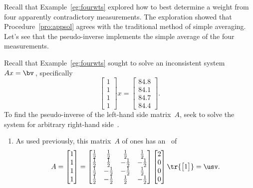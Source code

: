 \begin{example} \label{ex:} 
Recall that Example~\ref{eg:fourwts} explored how to best determine a  weight from four apparently contradictory measurements.
The exploration showed that Procedure~\ref{pro:appsol} agrees with the traditional method of simple averaging.
Let's see that the pseudo-inverse implements the simple average of the four measurements.

Recall that Example~\ref{eg:fourwts} sought to solve an inconsistent system \(Ax=\bv\)\,, specifically
\begin{equation*}
\begin{bmatrix} 1\\1\\1\\1 \end{bmatrix}x
=\begin{bmatrix} 84.8\\84.1\\84.7\\84.4 \end{bmatrix}.
\end{equation*}
To find the pseudo-inverse of the left-hand side matrix~\(A\), seek to solve the system for arbitrary right-hand side~\bv.
\begin{enumerate}
\item As used previously, this matrix~\(A\) of ones has an \svd\ of
\def\h{\frac12}
\begin{equation*}
A=\begin{bmatrix} 1\\1\\1\\1 \end{bmatrix}
=\begin{bmatrix} \h&\h&\h&\h
\\\h&\h&-\h&-\h
\\\h&-\h&-\h&\h
\\\h&-\h&\h&-\h \end{bmatrix}
\begin{bmatrix} 2\\0\\0\\0 \end{bmatrix}
\tr{\begin{bmatrix} 1 \end{bmatrix}}
=\usv.
\end{equation*}


\end{enumerate}
\end{example}
